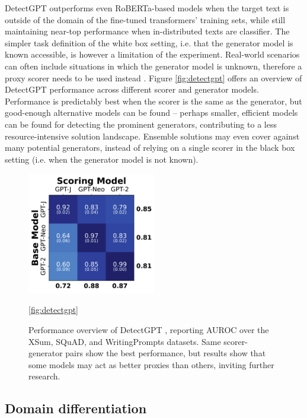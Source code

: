 DetectGPT outperforms even RoBERTa-based models when the target text is outside of the domain of the fine-tuned transformers' training sets, while still maintaining near-top performance when in-distributed texts are classifier.
The simpler task definition of the white box setting, i.e. that the generator model is known accessible, is however a limitation of the experiment.
Real-world scenarios can often include situations in which the generator model is unknown, therefore a proxy scorer needs to be used instead \citep{mireshghallah2023smaller}.
Figure \ref{fig:detectgpt} offers an overview of DetectGPT performance across different scorer and generator models.
Performance is predictably best when the scorer is the same as the generator, but good-enough alternative models can be found -- perhaps smaller, efficient models can be found for detecting the prominent generators, contributing to a less resource-intensive solution landscape.
Ensemble solutions may even cover against many potential generators, instead of relying on a single scorer in the black box setting (i.e. when the generator model is not known).

\begin{figure}[h]
    \centering
    \includegraphics[width=0.5\textwidth]{assets/detectgpt_modelcomp.png}
    \caption{
        Performance overview of DetectGPT \citep{mitchell2023detectgptzeroshotmachinegeneratedtext}, reporting AUROC \citep{bradley1997use} over the XSum, SQuAD, and WritingPrompts datasets.
        Same scorer-generator pairs show the best performance, but results show that some models may act as better proxies than others, inviting further research.
    }
    \ref{fig:detectgpt}
\end{figure}

\subsection{Domain differentiation}

